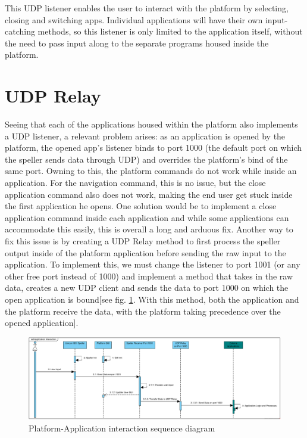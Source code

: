 This UDP listener enables the user to interact with the platform by selecting, closing and switching apps. Individual applications will have their own input-catching methods, so this listener is only limited to the application itself, without the need to pass input along to the separate programs housed inside the platform.

\section{UDP Relay} \label{sect:UDP Relay}
Seeing that each of the applications housed within the platform also implements a UDP listener, a relevant problem arises: as an application is opened by the platform, the opened app's listener binds to port 1000 (the default port on which the speller sends data through UDP) and overrides the platform's bind of the same port. Owning to this, the platform commands do not work while inside an application. For the navigation command, this is no issue, but the close application command also does not work, making the end user get stuck inside the first application he opens. One solution would be to implement a close application command inside each application and while some applications can accommodate this easily, this is overall a long and arduous fix.
\vspace{\baselineskip}\newline
Another way to fix this issue is by creating a UDP Relay method to first process the speller output inside of the platform application before sending the raw input to the application. To implement this, we must change the listener to port 1001 (or any other free port instead of 1000) and implement a method that takes in the raw data, creates a new UDP client and sends the data to port 1000 on which the open application is bound[see fig. \ref{fig:platform-app interaction}. With this method, both the application and the platform receive the data, with the platform taking precedence over the opened application].

\begin{figure}[H]
  \centering
  \includegraphics[width=1\textwidth]{Diagrams/Sequence/Platform - Application Interaction.png}
  \caption{Platform-Application interaction sequence diagram}
  \label{fig:platform-app interaction}
\end{figure}


